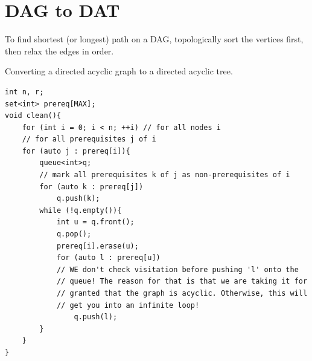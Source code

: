 \documentclass[12pt]{book}
\begin{document}
\section{DAG to DAT}
To find shortest (or longest) path on a DAG, topologically sort the vertices first, then relax the edges in order.

Converting a directed acyclic graph to a directed acyclic tree.
\begin{verbatim}
int n, r;
set<int> prereq[MAX];
void clean(){
	for (int i = 0; i < n; ++i)	// for all nodes i
	// for all prerequisites j of i
	for (auto j : prereq[i]){
		queue<int>q;
		// mark all prerequisites k of j as non-prerequisites of i
		for (auto k : prereq[j])
			q.push(k);
		while (!q.empty()){
			int u = q.front();
			q.pop();
			prereq[i].erase(u);
			for (auto l : prereq[u])
			// WE don't check visitation before pushing 'l' onto the
			// queue! The reason for that is that we are taking it for
			// granted that the graph is acyclic. Otherwise, this will
			// get you into an infinite loop!
				q.push(l);
		}
	}
}
\end{verbatim}
\end{document}
